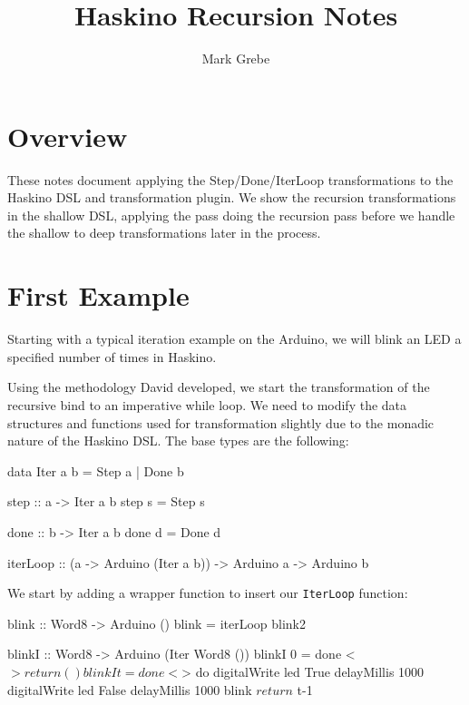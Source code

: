 \documentclass[11pt]{article}
\title{Haskino Recursion Notes}
\author{Mark Grebe}
\begin{document}
\maketitle

\section{Overview}

These notes document applying the Step/Done/IterLoop transformations
to the Haskino DSL and transformation plugin.  We show the recursion
transformations in the shallow DSL, applying the pass doing the recursion
pass before we handle the shallow to deep transformations
later in the process.

\section{First Example}

Starting with a typical iteration example on the Arduino, we will blink an LED
a specified number of times in Haskino.  

Using the methodology David developed, we start the transformation
of the recursive bind to an imperative while loop.  We need to modify 
the data structures and functions used for transformation slightly
due to the monadic nature of the Haskino DSL.  The base types are
the following:

\begin{Code}
data Iter a b
    = Step a
    | Done b

step :: a -> Iter a b
step s = Step s

done :: b -> Iter a b
done d = Done d

iterLoop :: (a -> Arduino (Iter a b)) -> Arduino a -> Arduino b
\end{Code}

We start by adding a wrapper function to insert our
\verb|IterLoop| function:

\begin{Code}
blink :: Word8 -> Arduino ()
blink = iterLoop blink2

blinkI :: Word8 -> Arduino (Iter Word8 ())
blinkI 0 = done <$> return ()
blinkI t = done <$> do
    digitalWrite led True
    delayMillis 1000
    digitalWrite led False
    delayMillis 1000
    blink $ return $ t-1
\end{Code}
\end{document}
